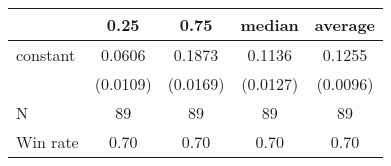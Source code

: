 \begin{tabular}{lcccc}
\hline
         &   0.25   &   0.75   &  median  & average   \\
\midrule
\midrule
constant & 0.0606   & 0.1873   & 0.1136   & 0.1255    \\
         & (0.0109) & (0.0169) & (0.0127) & (0.0096)  \\
N        & 89       & 89       & 89       & 89        \\
Win rate & 0.70     & 0.70     & 0.70     & 0.70      \\
\hline
\end{tabular}